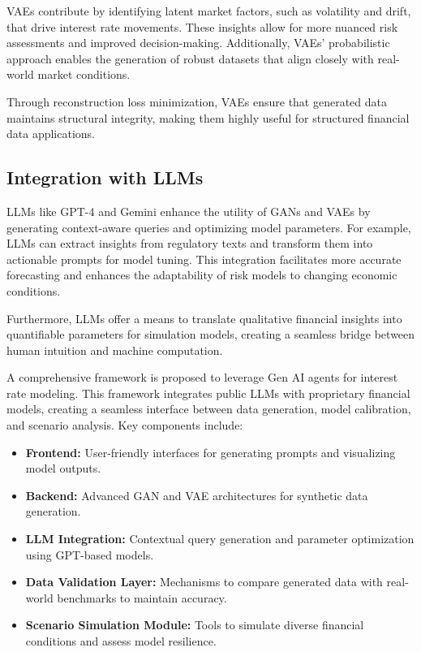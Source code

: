\documentclass[a4paper,headinclude=on,footinclude=on,12pt,oneside]{scrbook}
\begin{document}
	VAEs contribute by identifying latent market factors, such as volatility and drift, that drive interest rate movements. These insights allow for more nuanced risk assessments and improved decision-making. Additionally, VAEs’ probabilistic approach enables the generation of robust datasets that align closely with real-world market conditions.
	
	Through reconstruction loss minimization, VAEs ensure that generated data maintains structural integrity, making them highly useful for structured financial data applications.
	
	\subsection{Integration with LLMs}
	
	LLMs like GPT-4 and Gemini enhance the utility of GANs and VAEs by generating context-aware queries and optimizing model parameters. For example, LLMs can extract insights from regulatory texts and transform them into actionable prompts for model tuning. This integration facilitates more accurate forecasting and enhances the adaptability of risk models to changing economic conditions.
	
	Furthermore, LLMs offer a means to translate qualitative financial insights into quantifiable parameters for simulation models, creating a seamless bridge between human intuition and machine computation.
	
	
	A comprehensive framework is proposed to leverage Gen AI agents for interest rate modeling. This framework integrates public LLMs with proprietary financial models, creating a seamless interface between data generation, model calibration, and scenario analysis. Key components include:
	
	\begin{itemize}
		\item \textbf{Frontend:} User-friendly interfaces for generating prompts and visualizing model outputs.
		\item \textbf{Backend:} Advanced GAN and VAE architectures for synthetic data generation.
		\item \textbf{LLM Integration:} Contextual query generation and parameter optimization using GPT-based models.
		\item \textbf{Data Validation Layer:} Mechanisms to compare generated data with real-world benchmarks to maintain accuracy.
		\item \textbf{Scenario Simulation Module:} Tools to simulate diverse financial conditions and assess model resilience.
	\end{itemize}
	
\end{document}

